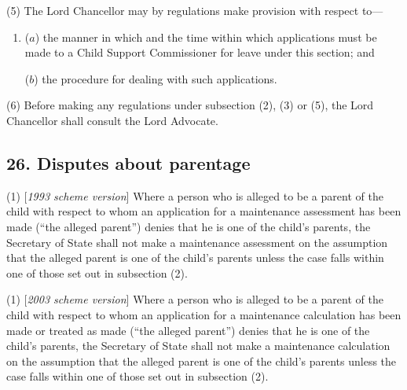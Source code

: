 \documentclass[12pt,a4paper]{article}
\begin{document}
(5) The Lord Chancellor may by regulations make provision with respect to—
\begin{enumerate}\item[]
($a$) the manner in which and the time within which applications must be made to a Child Support Commissioner for leave under this section; and

($b$) the procedure for dealing with such applications.
\end{enumerate}

(6) Before making any regulations under subsection (2), (3)  or (5), the Lord Chancellor shall consult the Lord Advocate.


\subsection{26. Disputes about parentage}

(1) [\emph{1993 scheme version}] Where a person who is alleged to be a parent of the child with respect to whom an application for a maintenance assessment has been made (“the alleged parent”) denies that he is one of the child’s parents, 
the Secretary of State  %
shall not make a maintenance assessment on the assumption that the alleged parent is one of the child’s parents unless the case falls within one of those set out in subsection (2).

(1) [\emph{2003 scheme version}] Where a person who is alleged to be a parent of the child with respect to whom an application for a 
maintenance calculation  %
has been made 
or treated as made  %
(“the alleged parent”) denies that he is one of the child’s parents, 
the Secretary of State  %
shall not make a 
maintenance calculation  %
on the assumption that the alleged parent is one of the child’s parents unless the case falls within one of those set out in subsection (2).
\end{document}
